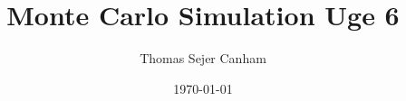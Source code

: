 \documentclass{article}
\title{Monte Carlo Simulation Uge 6}
\author{Thomas Sejer Canham}
\date{\today}
\theoremstyle{definition}
\theoremstyle{remark}
\begin{document}

\begin{titlepage}

    \maketitle
    \thispagestyle{empty}

\end{titlepage}
\end{document}
